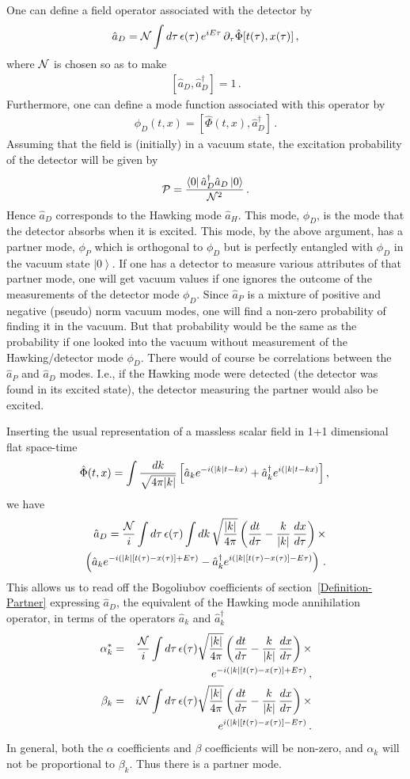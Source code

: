 \documentclass[aps,prd,showpacs,amssymb,nofootinbib,twocolumn]{revtex4}
\newcommand{\ket}[1]{\left|#1\right>}
\newcommand{\bra}[1]{\left<#1\right|}
\newcommand{\nn}{\nonumber\\}
\newcommand{\bea}{\begin{eqnarray}}
\newcommand{\eea}{\end{eqnarray}}
\begin{document}
One can define a field  operator associated with the detector by
%
\bea
\hat a_D = {\cal N} 
\int d\tau\,\epsilon(\tau)\,e^{iE\tau}\, 
\partial_\tau\hat\Phi[t(\tau), x(\tau)]
\,, 
\eea
%
where $\cal N$ is chosen so as to make
%
\bea
\left[\hat a_D,\hat a_D^\dagger\right]=1
\,.
\eea
%
Furthermore, one can define a mode function associated with this operator by 
%
\bea
\phi_D(t,x)= \left[\hat\Phi(t,x),\hat a_D^\dagger\right]
\,.
\eea
%
Assuming that the field is (initially) in a vacuum state, 
the excitation probability of the detector will be given by
%
\bea
{\cal P}= {\bra{0}\hat a_D^\dagger\hat a_D\ket{0}\over{\cal N}^2}
\,.
\eea
%
Hence $\hat a_D$ corresponds to the Hawking mode $\hat a_H$.  
%
This mode, $\phi_D$, is the mode that the detector absorbs when it is excited. 
%
This mode, by the above argument, has a partner mode, $\phi_P$ which is
orthogonal to $\phi_D$ but is perfectly entangled with $\phi_D$ in the
vacuum state $\ket{0}$. %
%
If one has a detector to measure various attributes of that partner mode, one
will get vacuum values if one ignores the outcome of the measurements of the
detector mode $\phi_D$. 
%
Since $\hat a_P$ is a mixture of positive and negative (pseudo) norm vacuum 
modes, one will find a non-zero probability of finding it in the vacuum. 
%
But that probability would be the same as the probability if one looked into 
the vacuum without measurement of the Hawking/detector mode $\phi_D$. 
%
There would of course be correlations between the $\hat a_P$ and $\hat a_D$ 
modes. 
%
I.e., if the Hawking mode were detected (the detector was found in its 
excited state), the detector measuring the partner would also be excited.

Inserting the usual representation of a massless scalar field in 1+1 
dimensional flat space-time 
%
\bea
\hat \Phi(t,x)= \int {dk\over \sqrt{4\pi|k|}}
\left[\hat a_k e^{-i(|k|t -kx)}+\hat a^\dagger_k e^{i(|k|t -kx)}\right]
,\,
\eea
%
we have
%
\bea
\hat a_D 
= 
\frac{\cal N}{i} 
\int d\tau\,\epsilon(\tau)  
\int dk\,\sqrt{|k|\over 4\pi} 
\left(\frac{dt}{d\tau}-\frac{k}{|k|}\,\frac{dx}{d\tau}\right) 
\times
\nn
\left(
\hat a_k e^{-i(|k|[t(\tau)-x(\tau)]+E\tau)}
-\hat a_k^\dagger e^{i(|k|[t(\tau)-x(\tau)]-E\tau)}\right)
\,.
\eea
%
This allows us to read off the Bogoliubov coefficients of 
section~\ref{Definition-Partner} expressing $\hat a_D$, 
the equivalent of the Hawking mode annihilation operator, 
in terms of the operators $\hat a_k$ and $\hat a^\dagger_k$ 
%
\bea
\alpha_k^*
&=& 
\frac{\cal N}{i} 
\int d\tau\,\epsilon(\tau)\sqrt{|k|\over 4\pi} 
\left(\frac{dt}{d\tau}-\frac{k}{|k|}\,\frac{dx}{d\tau}\right) 
\times
\nn
&&
e^{-i(|k|[t(\tau)-x(\tau)]+E\tau)}
\,,
\\
\beta_k 
&=& 
i{\cal N}
\int d\tau\,\epsilon(\tau)\sqrt{|k|\over 4\pi} 
\left(\frac{dt}{d\tau}-\frac{k}{|k|}\,\frac{dx}{d\tau}\right) 
\times
\nn
&&
e^{i(|k|[t(\tau)-x(\tau)]-E\tau)}
\,.
\eea
%
In general, both the $\alpha$ coefficients and $\beta$ coefficients will be 
non-zero, and $\alpha_k$ will not be proportional to $\beta_k$. 
%
Thus there is a partner mode. 
\end{document}
